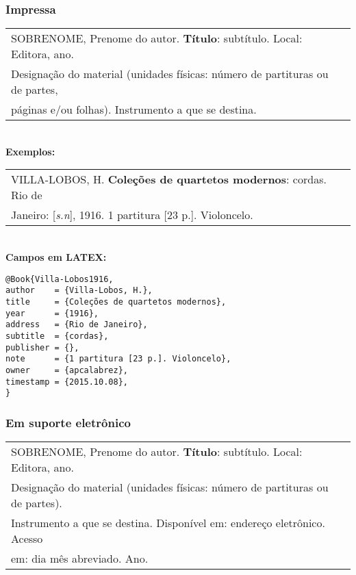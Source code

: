 \subsubsection{Impressa}


\begin{tabular}{|l|c|} \hline
	SOBRENOME, Prenome do autor. \textbf{Título}: subtítulo. Local: Editora, ano.\\
	Designação do material (unidades físicas: número de partituras ou de partes,\\
	páginas e/ou folhas). Instrumento a que se destina. 
	\\\hline
\end{tabular} \\

\textbf{Exemplos:} \\

\begin{tabular}{|l|c|} \hline
	VILLA-LOBOS, H. \textbf{Coleções de quartetos modernos}: cordas. Rio de \\Janeiro: [\textit{s.n}], 1916. 1 partitura [23 p.]. Violoncelo. 
	\\\hline
\end{tabular} \\

\textbf{Campos em LATEX:} 

\begin{verbatim}
@Book{Villa-Lobos1916,
author    = {Villa-Lobos, H.},
title     = {Coleções de quartetos modernos},
year      = {1916},
address   = {Rio de Janeiro},
subtitle  = {cordas},
publisher = {},
note      = {1 partitura [23 p.]. Violoncelo},
owner     = {apcalabrez},
timestamp = {2015.10.08},
}
\end{verbatim}

\subsubsection{Em suporte eletrônico}

\begin{tabular}{|l|c|} \hline
	SOBRENOME, Prenome do autor. \textbf{Título}: subtítulo. Local: Editora,
	ano. \\Designação do material (unidades físicas: número de
	partituras ou de partes).\\Instrumento a que se destina. Disponível
	em: endereço eletrônico. Acesso \\em: dia mês abreviado. Ano. 
	\\\hline
\end{tabular} \\

